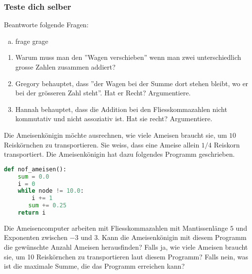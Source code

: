 \subsubsection*{\textcolor{blue-violet}{Teste dich selber}}
\begin{aufgabe}\label{addition_kontrollfragen}
Beantworte folgende Fragen:
\begin{enumerate}[(a)]
\item frage grage
\end{enumerate}
\end{aufgabe}
\begin{enumerate}
\item Warum muss man den ''Wagen verschieben'' wenn man zwei unterschiedlich grosse Zahlen zusammen addiert?
\item Gregory behauptet, dass ''der Wagen bei der Summe dort stehen bleibt, wo er bei der grösseren Zahl steht''. Hat er Recht? Argumentiere.
\item Hannah behauptet, dass die Addition bei den Fliesskommazahlen nicht kommutativ und nicht assoziativ ist. Hat sie recht? Argumentiere. 
\end{enumerate}
\begin{aufgabe}\label{ameisenkönigin}
Die Ameisenkönigin möchte ausrechnen, wie viele Ameisen braucht sie, um \(10\) Reiskörnchen zu transportieren. Sie weiss, dass eine Ameise allein \(1/4\) Reiskorn transportiert. Die Ameisenkönigin hat dazu folgendes Programm geschrieben.
\begin{lstlisting}[language=Python, caption={Programm von der Ameisenkönigin}]
def nof_ameisen():
    sum = 0.0
    i = 0
    while node != 10.0:
    	i += 1
       sum += 0.25
    return i
\end{lstlisting}
Die Ameisencomputer arbeiten mit Fliesskommazahlen mit Mantissenlänge \(5\) und Exponenten zwischen \(-3\) und \(3\).
Kann die Ameisenkönigin mit diesem Programm die gewünschte Anzahl Ameisen herausfinden? Falls ja, wie viele Ameisen braucht sie, um 10 Reiskörnchen zu transportieren laut diesem Programm? Falls nein, was ist die maximale Summe, die das Programm erreichen kann?
\end{aufgabe}